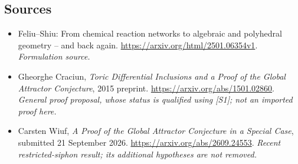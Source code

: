 \documentclass[11pt]{article}
\begin{document}
\subsection{Sources}
\begin{itemize}
\item[S1]Feliu–Shiu: From chemical reaction networks to algebraic and polyhedral geometry – and back again.
\url{https://arxiv.org/html/2501.06354v1}.
\textit{Formulation source.}
\item[E1]Gheorghe Craciun, \emph{Toric Differential Inclusions and a Proof of the Global Attractor Conjecture}, 2015 preprint.
\url{https://arxiv.org/abs/1501.02860}.
\textit{General proof proposal, whose status is qualified using [S1]; not an imported proof here.}
\item[E2]Carsten Wiuf, \emph{A Proof of the Global Attractor Conjecture in a Special Case}, submitted 21 September 2026.
\url{https://arxiv.org/abs/2609.24553}.
\textit{Recent restricted-siphon result; its additional hypotheses are not removed.}
\end{itemize}
\end{document}
